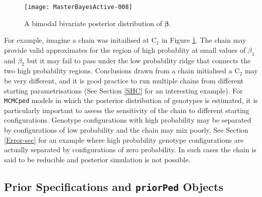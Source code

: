 \documentclass{article}
\begin{document}
\begin{figure}[!h]
\begin{center}
\texttt{[image: MasterBayesActive-008]}
\end{center}
\caption{A bimodal bivariate posterior distribution of $\bm{\beta}$.}
\label{densityPMM}
\end{figure}

For example, imagine a chain was initailised at $\textrm{C}_{1}$ in Figure \ref{densityPMM}. The chain may provide valid approximates for the region of high probablity at small values of $\beta_{1}$ and $\beta_{2}$ but it may 
fail to pass under the low probability ridge that connects the two high probability regions.  Conclusions drawn from a chain initialised a $\textrm{C}_{2}$ may be very different, and it is good practice to run multiple chains from different starting parametrisations (See Section \ref{SHC} for an interesting example).  For \texttt{MCMCped} models in which the posterior distribution of genotypes is estimated, it is particularly important to assess the sensitivity of the chain to different starting configurations.  Genotype configurations with high probability may be separated by configurations of low probability and the chain may mix poorly.  See Section \ref{Error-sec} for an example where high probability genotype configurations are actually separated by configurations of zero probability.  In such cases the chain is said to be reducible and posterior simulation is not possible.

\subsection{Prior Specifications and \texttt{priorPed} Objects}
\label{prior-sec}
\end{document}
